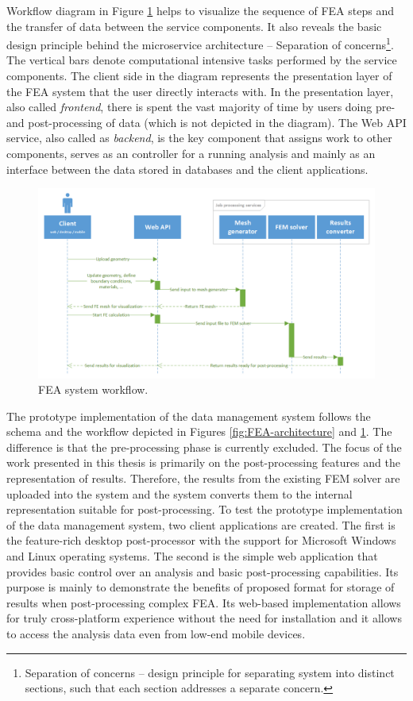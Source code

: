 Workflow diagram in Figure \ref{fig:FEA-workflow} helps to visualize the sequence of FEA steps and the transfer of data between the service components. It also reveals the basic design principle behind the microservice architecture -- Separation of concerns\footnote{Separation of concerns -- design principle for separating system into distinct sections, such that each section addresses a separate concern.}. The vertical bars denote computational intensive tasks performed by the service components. The client side in the diagram represents the presentation layer of the FEA system that the user directly interacts with. In the presentation layer, also called \textit{frontend}, there is spent the vast majority of time by users doing pre- and post-processing of data (which is not depicted in the diagram). The Web API service, also called as \textit{backend}, is the key component that assigns work to other components, serves as an controller for a running analysis and mainly as an interface between the data stored in databases and the client applications.

\begin{figure}[H]
    \centering
    \includegraphics[width=\textwidth]{figures/chapter-data-management/FEA-workflow}
    \decoRule
    \caption{FEA system workflow.}
    \label{fig:FEA-workflow}
\end{figure}

The prototype implementation of the data management system follows the schema and the workflow depicted in Figures \ref{fig:FEA-architecture} and \ref{fig:FEA-workflow}. The difference is that the pre-processing phase is currently excluded. The focus of the work presented in this thesis is primarily on the post-processing features and the representation of results. Therefore, the results from the existing FEM solver are uploaded into the system and the system converts them to the internal representation suitable for post-processing. To test the prototype implementation of the data management system, two client applications are created. The first is the feature-rich desktop post-processor with the support for Microsoft Windows and Linux operating systems. The second is the simple web application that provides basic control over an analysis and basic post-processing capabilities. Its purpose is mainly to demonstrate the benefits of proposed format for storage of results when post-processing complex FEA. Its web-based implementation allows for truly cross-platform experience without the need for installation and it allows to access the analysis data even from low-end mobile devices.

